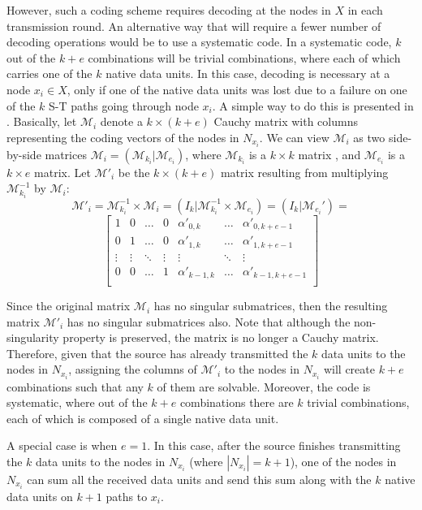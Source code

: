 \documentclass[conference]{IEEEtran}
\newcommand{\mc}[1]{\mathcal{#1}}
\begin{document}
However, such a coding scheme requires decoding at the nodes in $X$ in each transmission round. An alternative way that will require a fewer number of decoding operations would be to use a systematic code. In a systematic code, $k$ out of the $k+e$ combinations will be trivial combinations, where each of which carries one of the $k$ native data units. In this case, decoding is necessary at a node $x_i \in X$, only if one of the native data units was lost due to a failure on one of the $k$ S-T paths going through node $x_i$. A simple way to do this is presented in \cite{JJ03}. Basically, let $\mc{M}_i$ denote a $k \times (k+e)$ Cauchy matrix with columns representing the coding vectors of the nodes in $N_{x_i}$. We can view $\mc{M}_i$ as two side-by-side matrices $\mc{M}_i = (\mc{M}_{k_i}|\mc{M}_{e_i})$, where $\mc{M}_{k_i}$ is a $k \times k$ matrix , and $\mc{M}_{e_i}$ is a $k \times e$ matrix. Let $\mc{M}'_i$ be the $k \times (k+e)$ matrix resulting from multiplying  $\mc{M}_{k_i}^{-1}$ by $\mc{M}_i$:
\[\mc{M}'_i = \mc{M}_{k_i}^{-1} \times \mc{M}_i = (I_k|\mc{M}_{k_i}^{-1} \times \mc{M}_{e_i}) = (I_k|\mc{M}_{e_i}') = \]
\[
\left[
\begin{array}{cccc|ccc}
1 & 0 & \dots & 0 & \alpha'_{0,k} & \dots & \alpha'_{0,k+e-1} \\
0 & 1 & \dots & 0 & \alpha'_{1,k} & \dots & \alpha'_{1,k+e-1} \\
\vdots & \vdots & \ddots & \vdots & \vdots & \ddots & \vdots \\
0 & 0 & \dots & 1 & \alpha'_{k-1,k} & \dots & \alpha'_{k-1,k+e-1} \\
\end{array} \right]
\]

Since the original matrix $\mc{M}_i$ has no singular submatrices, then the resulting matrix $\mc{M}'_i$ has no singular submatrices also. Note that although the non-singularity property is preserved, the matrix is no longer a Cauchy matrix. Therefore, given that the source has already transmitted the $k$ data units to the nodes in $N_{x_i}$, assigning the columns of $\mc{M}'_i$ to the nodes in $N_{x_i}$ will create $k+e$ combinations such that any $k$ of them are solvable. Moreover, the code is systematic, where out of the $k+e$ combinations there are $k$ trivial combinations, each of which is composed of a single native data unit. 

A special case is when $e=1$. In this case, after the source finishes transmitting the $k$ data units to the nodes in $N_{x_i}$ (where $|N_{x_i}| = k+1$), one of the nodes in $N_{x_i}$ can sum all the received data units and send this sum along with the $k$ native data units on $k+1$ paths to $x_i$. 
\end{document}
